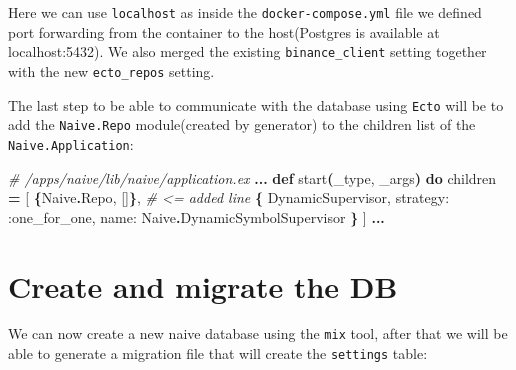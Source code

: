 \documentclass[
  oneside]{book}
\newenvironment{Shaded}{\begin{snugshade}}{\end{snugshade}}
\newcommand{\AttributeTok}[1]{\textcolor[rgb]{0.13,0.29,0.53}{#1}}
\newcommand{\CommentTok}[1]{\textcolor[rgb]{0.56,0.35,0.01}{\textit{#1}}}
\newcommand{\ConstantTok}[1]{\textcolor[rgb]{0.56,0.35,0.01}{#1}}
\newcommand{\ExtensionTok}[1]{#1}
\newcommand{\FunctionTok}[1]{\textcolor[rgb]{0.13,0.29,0.53}{\textbf{#1}}}
\newcommand{\KeywordTok}[1]{\textcolor[rgb]{0.13,0.29,0.53}{\textbf{#1}}}
\newcommand{\NormalTok}[1]{#1}
\newcommand{\OperatorTok}[1]{\textcolor[rgb]{0.81,0.36,0.00}{\textbf{#1}}}
\newcommand{\OtherTok}[1]{\textcolor[rgb]{0.56,0.35,0.01}{#1}}
\newcommand{\VariableTok}[1]{\textcolor[rgb]{0.00,0.00,0.00}{#1}}
\begin{document}
Here we can use \texttt{localhost} as inside the \texttt{docker-compose.yml} file we defined port forwarding from the container to the host(Postgres is available at localhost:5432). We also merged the existing \texttt{binance\_client} setting together with the new \texttt{ecto\_repos} setting.

The last step to be able to communicate with the database using \texttt{Ecto} will be to add the \texttt{Naive.Repo} module(created by generator) to the children list of the \texttt{Naive.Application}:

\begin{Shaded}
\begin{Highlighting}[]
\CommentTok{\# /apps/naive/lib/naive/application.ex}
\OperatorTok{...}
  \KeywordTok{def}\NormalTok{ start}\FunctionTok{(}\NormalTok{\_type, \_args}\FunctionTok{)} \KeywordTok{do}
\NormalTok{    children }\OperatorTok{=} \OtherTok{[}
      \FunctionTok{\{}\ConstantTok{Naive}\OperatorTok{.}\ConstantTok{Repo}\NormalTok{, }\OtherTok{[]}\FunctionTok{\}}\NormalTok{, }\CommentTok{\# \textless{}= added line}
      \FunctionTok{\{}
        \ConstantTok{DynamicSupervisor}\NormalTok{,}
        \VariableTok{strategy:} \VariableTok{:one\_for\_one}\NormalTok{, }\VariableTok{name:} \ConstantTok{Naive}\OperatorTok{.}\ConstantTok{DynamicSymbolSupervisor}
      \FunctionTok{\}}
    \OtherTok{]}
    \OperatorTok{...}
\end{Highlighting}
\end{Shaded}

\section{Create and migrate the DB}\label{create-and-migrate-the-db}

We can now create a new naive database using the \texttt{mix} tool, after that we will be able to generate a migration file that will create the \texttt{settings} table:

\begin{Shaded}
\end{Shaded}
\end{document}
